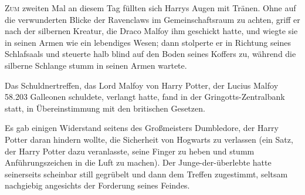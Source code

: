 

\lettrine{Z}{um} zweiten Mal an diesem Tag füllten sich Harrys Augen mit Tränen. Ohne auf die verwunderten Blicke der Ravenclaws im Gemeinschaftsraum zu achten, griff er nach der silbernen Kreatur, die Draco Malfoy ihm geschickt hatte, und wiegte sie in seinen Armen wie ein lebendiges Wesen; dann stolperte er in Richtung seines Schlafsaals und steuerte halb blind auf den Boden seines Koffers zu, während die silberne Schlange stumm in seinen Armen wartete.


Das Schuldnertreffen, das Lord Malfoy von Harry Potter, der Lucius Malfoy 58.203 Galleonen schuldete, verlangt hatte, fand in der Gringotts-Zentralbank statt, in Übereinstimmung mit den britischen Gesetzen.

Es gab einigen Widerstand seitens des Großmeisters Dumbledore, der Harry Potter daran hindern wollte, die Sicherheit von Hogwarts zu verlassen (ein Satz, der Harry Potter dazu veranlasste, seine Finger zu heben und stumm Anführungszeichen in die Luft zu machen). Der Junge-der-überlebte hatte seinerseits scheinbar still gegrübelt und dann dem Treffen zugestimmt, seltsam nachgiebig angesichts der Forderung seines Feindes.

